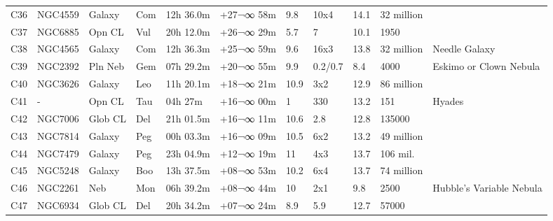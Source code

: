 \documentclass[10pt,twoside,a4paper,english]{report}
\begin{document}
\begin{longtable}{@{}lllllllllll@{}}
C36        & NGC4559     & Galaxy     & Com       & 12h 36.0m & +27¬∞ 58m  & 9.8       & 10x4                 & 14.1     & 32 million          &                                 \\ 
C37        & NGC6885     & Opn CL     & Vul       & 20h 12.0m & +26¬∞ 29m  & 5.7       & 7                    & 10.1     & 1950                &                                 \\ 
C38        & NGC4565     & Galaxy     & Com       & 12h 36.3m & +25¬∞ 59m  & 9.6       & 16x3                 & 13.8     & 32 million          & Needle Galaxy                   \\ 
C39        & NGC2392     & Pln Neb    & Gem       & 07h 29.2m & +20¬∞ 55m  & 9.9       & 0.2/0.7              & 8.4      & 4000                & Eskimo or Clown Nebula          \\ 
C40        & NGC3626     & Galaxy     & Leo       & 11h 20.1m & +18¬∞ 21m  & 10.9      & 3x2                  & 12.9     & 86 million          &                                 \\ 
C41        & -           & Opn CL     & Tau       & 04h 27m   & +16¬∞ 00m  & 1         & 330                  & 13.2     & 151                 & Hyades                          \\ 
C42        & NGC7006     & Glob CL    & Del       & 21h 01.5m & +16¬∞ 11m  & 10.6      & 2.8                  & 12.8     & 135000              &                                 \\ 
C43        & NGC7814     & Galaxy     & Peg       & 00h 03.3m & +16¬∞ 09m  & 10.5      & 6x2                  & 13.2     & 49 million          &                                 \\ 
C44        & NGC7479     & Galaxy     & Peg       & 23h 04.9m & +12¬∞ 19m  & 11        & 4x3                  & 13.7     & 106 mil.            &                                 \\ 
C45        & NGC5248     & Galaxy     & Boo       & 13h 37.5m & +08¬∞ 53m  & 10.2      & 6x4                  & 13.7     & 74 million          &                                 \\ 
C46        & NGC2261     & Neb        & Mon       & 06h 39.2m & +08¬∞ 44m  & 10        & 2x1                  & 9.8      & 2500                & Hubble's Variable Nebula        \\ 
C47        & NGC6934     & Glob CL    & Del       & 20h 34.2m & +07¬∞ 24m  & 8.9       & 5.9                  & 12.7     & 57000               &                                 \\ 

\end{longtable}
\end{document}
